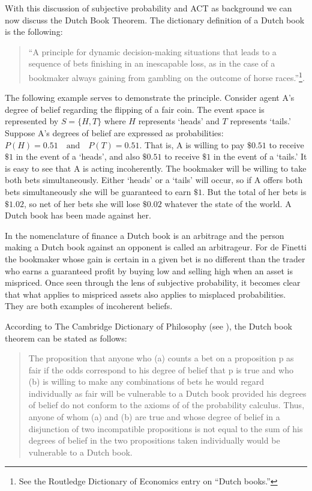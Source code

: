 \documentclass[11pt,]{article}
\begin{document}
With this discussion of subjective probability and ACT as background we
can now discuss the Dutch Book Theorem. The dictionary definition of a
Dutch book is the following:

\begin{quote}
``A principle for dynamic decision-making situations that leads to a
sequence of bets finishing in an inescapable loss, as in the case of a
bookmaker always gaining from gambling on the outcome of horse
races.''\footnote{See the Routledge Dictionary of Economics entry on
  ``Dutch books.''}.
\end{quote}

The following example serves to demonstrate the principle. Consider
agent A's degree of belief regarding the flipping of a fair coin. The
event space is represented by \(S = \{H, T\}\) where \(H\) represents
`heads' and \(T\) represents `tails.' Suppose A's degrees of belief are
expressed as probabilities:
\(P(H) = 0.51 \quad \mbox{and} \quad P(T) = 0.51\). That is, A is
willing to pay \(\$0.51\) to receive \(\$1\) in the event of a `heads',
and also \(\$0.51\) to receive \(\$1\) in the event of a `tails.' It is
easy to see that A is acting incoherently. The bookmaker will be willing
to take both bets simultaneously. Either `heads' or a `tails' will
occur, so if A offers both bets simultaneously she will be guaranteed to
earn \(\$1\). But the total of her bets is \(\$1.02\), so net of her
bets she will lose \(\$0.02\) whatever the state of the world. A Dutch
book has been made against her.

In the nomenclature of finance a Dutch book is an arbitrage and the
person making a Dutch book against an opponent is called an arbitrageur.
For de Finetti the bookmaker whose gain is certain in a given bet is no
different than the trader who earns a guaranteed profit by buying low
and selling high when an asset is mispriced. Once seen through the lens
of subjective probability, it becomes clear that what applies to
mispriced assets also applies to misplaced probabilities. They are both
examples of incoherent beliefs.

According to The Cambridge Dictionary of Philosophy (see
\citet{CambDictPhil}), the Dutch book theorem can be stated as follows:

\begin{quote}
The proposition that anyone who (a) counts a bet on a proposition p as
fair if the odds correspond to his degree of belief that p is true and
who (b) is willing to make any combinations of bets he would regard
individually as fair will be vulnerable to a Dutch book provided his
degrees of belief do not conform to the axioms of of the probability
calculus. Thus, anyone of whom (a) and (b) are true and whose degree of
belief in a disjunction of two incompatible propositions is not equal to
the sum of his degrees of belief in the two propositions taken
individually would be vulnerable to a Dutch book.
\end{quote}
\end{document}
